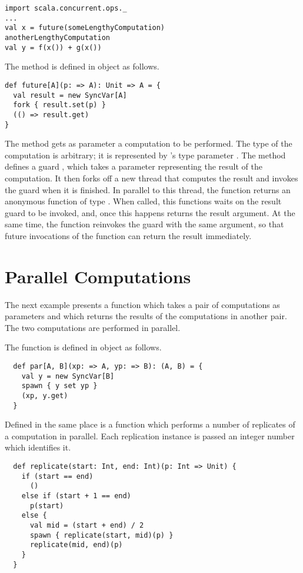 \begin{lstlisting}
import scala.concurrent.ops._
...
val x = future(someLengthyComputation)
anotherLengthyComputation
val y = f(x()) + g(x())
\end{lstlisting}

The  method is defined in object
 as follows.
\begin{lstlisting}
def future[A](p: => A): Unit => A = {
  val result = new SyncVar[A]
  fork { result.set(p) }
  (() => result.get)
}
\end{lstlisting}

The  method gets as parameter a computation  to
be performed. The type of the computation is arbitrary; it is
represented by 's type parameter .  The
 method defines a guard , which takes a
parameter representing the result of the computation. It then forks
off a new thread that computes the result and invokes the
 guard when it is finished. In parallel to this thread,
the function returns an anonymous function of type .
When called, this functions waits on the result guard to be
invoked, and, once this happens returns the result argument.
At the same time, the function reinvokes the  guard with
the same argument, so that future invocations of the function can
return the result immediately.

\section{Parallel Computations}

The next example presents a function  which takes a pair of
computations as parameters and which returns the results of the computations
in another pair. The two computations are performed in parallel.

The function is defined in object
 as follows.
\begin{lstlisting}
  def par[A, B](xp: => A, yp: => B): (A, B) = {
    val y = new SyncVar[B]
    spawn { y set yp }
    (xp, y.get)
  }
\end{lstlisting}
Defined in the same place is a function  which performs a
number of replicates of a computation in parallel. Each
replication instance is passed an integer number which identifies it.
\begin{lstlisting}
  def replicate(start: Int, end: Int)(p: Int => Unit) {
    if (start == end)
      ()
    else if (start + 1 == end)
      p(start)
    else {
      val mid = (start + end) / 2
      spawn { replicate(start, mid)(p) }
      replicate(mid, end)(p)
    }
  }
\end{lstlisting}

